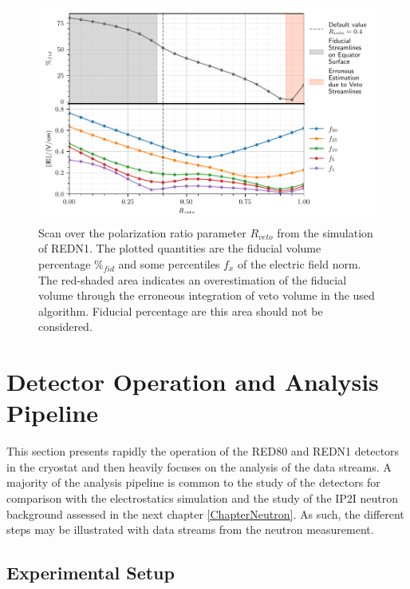 \begin{figure}
\centering
\includegraphics[scale=1]{Figures/ElectrodesExperimental/redn1_scan_veto_ratio.pdf}
\caption{Scan over the polarization ratio parameter $R_{veto}$ from the simulation of REDN1. The plotted quantities are the fiducial volume percentage $\%_{fid}$ and some percentiles $f_x$ of the electric field norm. The red-shaded area indicates an overestimation of the fiducial volume through the erroneous integration of veto volume in the used algorithm. Fiducial percentage are this area should not be considered.}
\label{fig:redn1-scan}
\end{figure}


\section{Detector Operation and Analysis Pipeline}
\label{par:analysis-pipeline}

This section presents rapidly the operation of the RED80 and REDN1 detectors in the cryostat and then heavily focuses on the analysis of the data streams. A majority of the analysis pipeline is common to the study of the detectors for comparison with the electrostatics simulation and the study of the IP2I neutron background assessed in the next chapter \ref{ChapterNeutron}. As such, the different steps may be illustrated with data streams from the neutron measurement.


\subsection{Experimental Setup}

